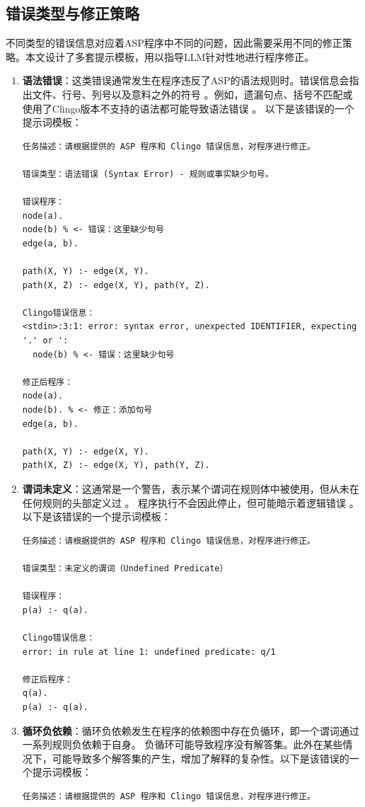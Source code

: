 \subsection{错误类型与修正策略}
不同类型的错误信息对应着ASP程序中不同的问题，因此需要采用不同的修正策略。本文设计了多套提示模板，用以指导LLM针对性地进行程序修正。
\begin{enumerate}[itemsep=0pt,parsep=0pt]
\item \textbf{语法错误}：这类错误通常发生在程序违反了ASP的语法规则时。错误信息会指出文件、行号、列号以及意料之外的符号 。例如，遗漏句点、括号不匹配或使用了Clingo版本不支持的语法都可能导致语法错误 。
以下是该错误的一个提示词模板：
\begin{lstlisting}
任务描述：请根据提供的 ASP 程序和 Clingo 错误信息，对程序进行修正。

错误类型：语法错误 (Syntax Error) - 规则或事实缺少句号。

错误程序：
node(a).
node(b) % <- 错误：这里缺少句号
edge(a, b).

path(X, Y) :- edge(X, Y).
path(X, Z) :- edge(X, Y), path(Y, Z).

Clingo错误信息：
<stdin>:3:1: error: syntax error, unexpected IDENTIFIER, expecting '.' or ':
  node(b) % <- 错误：这里缺少句号

修正后程序：
node(a).
node(b). % <- 修正：添加句号
edge(a, b).

path(X, Y) :- edge(X, Y).
path(X, Z) :- edge(X, Y), path(Y, Z).
\end{lstlisting}
\item \textbf{谓词未定义}：这通常是一个警告，表示某个谓词在规则体中被使用，但从未在任何规则的头部定义过 。
程序执行不会因此停止，但可能暗示着逻辑错误 。以下是该错误的一个提示词模板：
\begin{lstlisting}
任务描述：请根据提供的 ASP 程序和 Clingo 错误信息，对程序进行修正。

错误类型：未定义的谓词（Undefined Predicate）

错误程序：
p(a) :- q(a).

Clingo错误信息：
error: in rule at line 1: undefined predicate: q/1

修正后程序：
q(a).
p(a) :- q(a).
\end{lstlisting}
\item \textbf{循环负依赖}：循环负依赖发生在程序的依赖图中存在负循环，即一个谓词通过一系列规则负依赖于自身。
负循环可能导致程序没有解答集。​此外在某些情况下，可能导致多个解答集的产生，增加了解释的复杂性。以下是该错误的一个提示词模板：
\begin{lstlisting}
任务描述：请根据提供的 ASP 程序和 Clingo 错误信息，对程序进行修正。


\end{lstlisting}
\end{enumerate}
